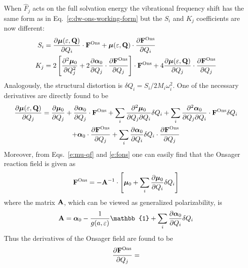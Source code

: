 \documentclass[a4paper,titlepage,twoside,fleqn,12pt]{book}
\newcommand{\BM}[1]{\bm{#1}}
\newcommand{\fderiv}[2]{\ensuremath{
\frac{\partial #1}{\partial #2}}}
\newcommand{\sderiv}[2]{\ensuremath{
\frac{\partial^2 #1}{\partial #2^2}
}}
\newcommand{\sderivd}[3]{\ensuremath{
\frac{\partial^2 #1}{\partial #2 \partial #3}
}}
\begin{document}
\begin{refsection}
When $\hat{F}_j$ acts on the full solvation energy 
the vibrational frequency shift has the same form as 
in Eq.~\eqref{e:dw-ons-working-form}
but the $S_i$ and $K_j$ coefficients are now different:
%
\begin{subequations}
 \begin{align}
  S_i &= \fderiv{{\BM \mu}(\varepsilon,{\bf Q})}{Q_i} \cdot {\bf F}^{\rm Ons}
           + {\BM \mu}(\varepsilon,{\bf Q}) \cdot \fderiv{{\bf F}^{\rm Ons}}{Q_i}
        \label{e:ons-si-iter}  \\
  K_j &= 2\left[ 
             \sderiv{{\BM \mu}_0}{Q_j}  
        + 2 \fderiv{{\BM \alpha}_0}{Q_j}  \cdot \fderiv{{\bf F}^{\rm Ons}}{Q_j}
         \right] \cdot {\bf F}^{\rm Ons}
         + 4\fderiv{{\BM \mu}(\varepsilon,{\bf Q})}{Q_j} \cdot \fderiv{{\bf F}^{\rm Ons}}{Q_j}
        \label{e:ons-ki-iter}
 \end{align} %
\end{subequations}
%
Analogously, the structural distortion is 
$\delta Q_i=S_i/2M_i\omega_i^2$.
One of the necessary derivatives are directly found to be
%
\begin{multline} \label{e:mu-qf-derivative}
\fderiv{{\BM \mu}(\varepsilon,{\bf Q})}{Q_j} =
\fderiv{{\BM \mu}_0}{Q_j} + \fderiv{{\BM \alpha}_0}{Q_j}  \cdot {\bf F}^{\rm Ons}
+ \sum_i \sderivd{{\BM \mu}_0}{Q_j}{Q_i} \delta Q_i 
+ \sum_i \sderivd{{\BM \alpha}_0}{Q_j}{Q_i} \cdot {\bf F}^{\rm Ons} \delta Q_i \\
+ {\BM \alpha}_0  \cdot \fderiv{{\bf F}^{\rm Ons}}{Q_j} 
+ \sum_i \fderiv{{\BM \alpha}_0}{Q_i} \delta Q_i \cdot \fderiv{{\bf F}^{\rm Ons}}{Q_j} 
\end{multline}
%
Moreover, from Eqs.~\eqref{e:mu-qf}
and \eqref{e:fons} one can easily find that
the Onsager reaction field is given as
%
\begin{equation} \label{e:ons-field}
 {\bf F}^{\rm Ons} = -{\bf A}^{-1} \cdot 
\left[ 
   {\BM \mu}_0 + \sum_i \fderiv{{\BM \mu}_0}{Q_i}\delta Q_i
\right]
\end{equation}
%
where the matrix $\bf A$, which can be viewed as generalized polarizability,
is
%
\begin{equation} \label{e:a-matrix}
{\bf A} = {\BM \alpha}_0 - \frac{1}{g(a,\varepsilon)} \mathbb{1} 
   + \sum_i \fderiv{{\BM \alpha}_0}{Q_i}\delta Q_i
\end{equation}
%
Thus the derivatives of the Onsager field are found to be
%
\begin{equation} \label{e:ons-field-deriv}
\fderiv{{\bf F}^{\rm Ons}}{Q_j}  = 

\end{equation}
\end{refsection}
\end{document}

